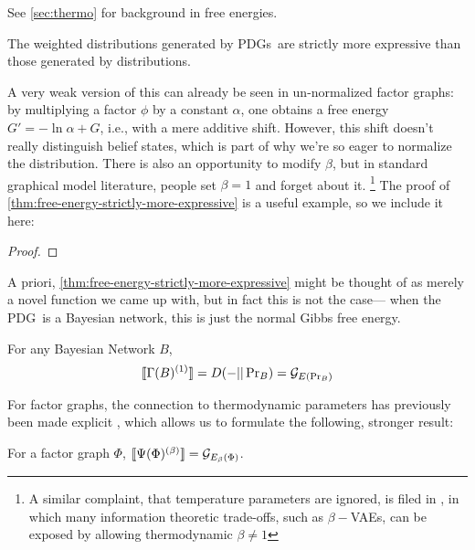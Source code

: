 \documentclass{article}
\newcommand\MaxEnt{{\overset{\uparrow}{\mathbf H}}}
\newcommand{\MN}{PDG}
\newcommand{\MNs}{\MN s}
\begin{document}
	See \ref{sec:thermo} for background in free energies. %
	
	\begin{theorem}\label{thm:free-energy-strictly-more-expressive}
	 	The weighted distributions generated by \MNs\ are strictly more expressive than those generated by distributions.
	\end{theorem}
	
	A very weak version of this can already be seen in un-normalized factor graphs: by multiplying a factor $\phi$ by a constant $\alpha$, one obtains a free energy $G' = - \ln \alpha + G$, i.e., with a mere additive shift. However, this shift doesn't really distinguish belief states, which is part of why we're so eager to normalize the distribution.
	There is also an opportunity to modify $\beta$, but in standard graphical model literature, people set $\beta = 1$ and forget about it.%
		\footnote{A similar complaint, that temperature parameters are ignored, is filed in \cite{fixing-a-broken-elbo}, in which many information theoretic trade-offs, such as $\beta-$VAEs, can be exposed by allowing thermodynamic $\beta \neq 1$}
	The proof of \cref{thm:free-energy-strictly-more-expressive} is a useful example, so we include it here:

	\begin{proof}
		\todo{case where $\bbr{M}_\MaxEnt = \bbr{M'}_\MaxEnt$ but $\bbr{M} \neq \bbr{M'}$}
		
		
	\end{proof}

	A priori, \cref{thm:free-energy-strictly-more-expressive} might be thought of as merely a novel function we came up with, but in fact this is not the case--- when the \MN\ is a Bayesian network, this is just the normal Gibbs free energy.

	\begin{conj}
		For any Bayesian Network $B$, 
		$$\llbracket\Gamma(B)^{(1)}\rrbracket = D(- || \Pr\nolimits_B) = \mathcal G_{E(\Pr_B)}$$
	\end{conj}
	
	For factor graphs, the connection to thermodynamic parameters has previously been made explicit \cite{}, which allows us to formulate the following, stronger result:
	
	\begin{conj}
		For a factor graph $\Phi$, $\llbracket\Psi(\Phi)^{(\beta)}\rrbracket = \mathcal G_{E_\beta(\Phi)}$.
	\end{conj}
\end{document}
